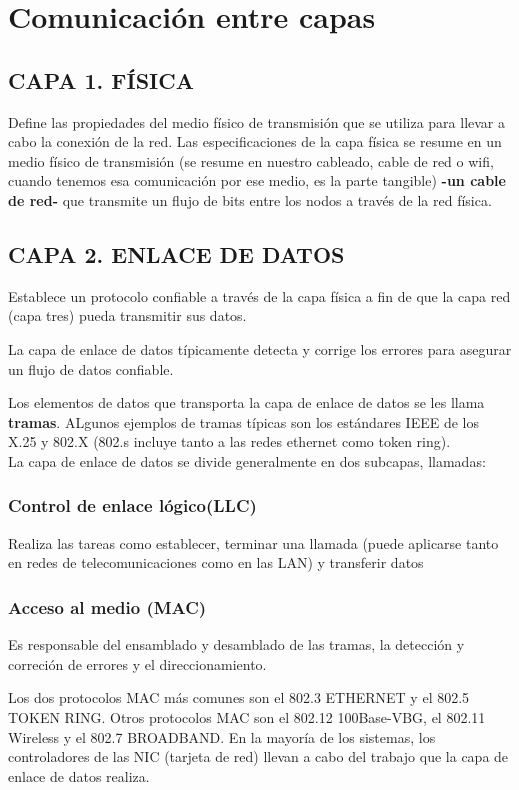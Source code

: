 \documentclass[letterpaper,12pt]{article}
\begin{document}
\begin{sloppypar}
\section{Comunicación entre capas}
\subsection{CAPA 1. FÍSICA}
Define las propiedades del medio físico de transmisión que se utiliza para llevar a cabo la conexión de la red. Las especificaciones de la capa física se resume en un medio físico de transmisión (se resume en nuestro cableado, cable de red o wifi, cuando tenemos esa comunicación por ese medio, es la parte tangible) \textbf{-un cable de red-} que transmite un flujo de bits entre los nodos a través de la red física.
\subsection{CAPA 2. ENLACE DE DATOS}
Establece un protocolo confiable a través de la capa física a fin de que la capa red (capa tres) pueda transmitir sus datos.

La capa de enlace de datos típicamente detecta y corrige los errores para asegurar un flujo de datos confiable.

Los elementos de datos que transporta la capa de enlace de datos se les llama \textbf{tramas}. ALgunos ejemplos de tramas típicas son los estándares IEEE de los X.25 y 802.X (802.s incluye tanto a las redes ethernet como token ring). 
\vspace{0.3cm}\\ 
La capa de enlace de datos se divide generalmente en dos subcapas, llamadas:
\subsubsection{Control de enlace lógico(LLC)}
Realiza las tareas como establecer, terminar una llamada (puede aplicarse tanto en redes de telecomunicaciones como en las LAN) y transferir datos
\subsubsection{Acceso al medio (MAC)}
Es responsable del ensamblado y desamblado de las tramas, la detección y correción de errores y el direccionamiento.

Los dos protocolos MAC más comunes son el 802.3 ETHERNET y el 802.5 TOKEN RING. Otros protocolos MAC son el 802.12 100Base-VBG, el 802.11 Wireless y el 802.7 BROADBAND. En la mayoría de los sistemas, los controladores de las NIC (tarjeta de red) llevan a cabo del trabajo que la capa de enlace de datos realiza.


\end{sloppypar}
\end{document}

